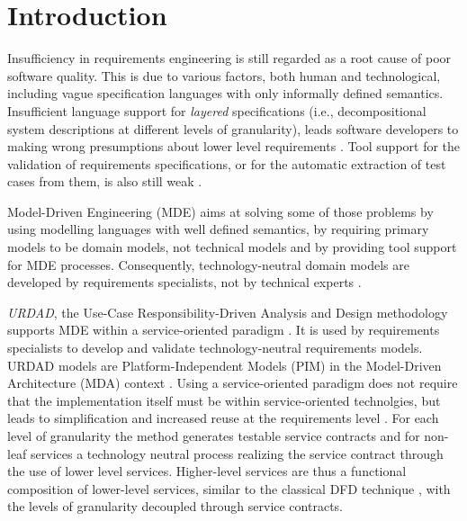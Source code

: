 \section{Introduction}
Insufficiency in requirements engineering is still regarded as a root cause of poor software quality. This is due to various factors, both human and technological, including vague specification languages with only informally defined semantics. Insufficient language support for \emph{layered} specifications (i.e., decompositional system descriptions at different levels of granularity), leads software developers to making wrong presumptions about lower level requirements \cite{espana_evaluating_2009}. Tool support for the validation of requirements specifications, or for the automatic extraction of test cases from them, is also still weak \cite{bashardoust-tajali_extracting_2008}.

Model-Driven Engineering (MDE) \cite{schmidt_model_2006} aims at solving some of those problems by using modelling languages with well defined semantics, by requiring primary models to be domain models, not technical models \cite{asnina_computation_2010} and by providing tool support for MDE processes. Consequently, technology-neutral domain models are developed by requirements specialists, not by technical experts \cite{asnina_computation_2010}.

\emph{URDAD}, the Use-Case Responsibility-Driven Analysis and Design methodology \cite{fritz_solms_technology_2007} supports MDE within a service-oriented paradigm \cite{solms_urdad_2010}. It is used by requirements specialists to develop and validate technology-neutral requirements models. URDAD models are Platform-Independent Models (PIM) in the Model-Driven Architecture (MDA) context \cite{solms_urdad_2010}.  Using a service-oriented paradigm does not require that the implementation itself must be within service-oriented technolgies, but leads to  simplification and increased reuse at the requirements level \cite{halpin_it_2009,cao_modeling_2008}. For each level of granularity the method generates testable service contracts and for non-leaf services a technology neutral process realizing the service contract through the use of lower level services. Higher-level services are thus a functional composition of lower-level services, similar to the classical DFD technique \cite{demarco_tom_structured_1978}, with the levels of granularity decoupled through service contracts.

